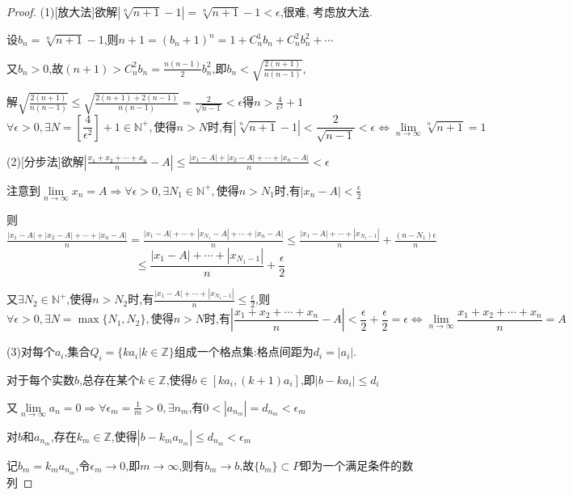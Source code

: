 \begin{proof}
    (1)[放大法]欲解$|\sqrt[n]{n+1}-1|=\sqrt[n]{n+1}-1<\epsilon$,很难, 考虑放大法.

    设$b_n=\sqrt[n]{n+1}-1$,则$n+1=(b_n+1)^n=1+C_n^1b_n+C_n^2b_n^2+\cdots $

    又$b_n>0$,故$(n+1)>C_n^2b_n=\frac{n(n-1)}{2}b_n^2$,即$b_n< \sqrt{\frac{2(n+1)}{n(n-1)}}$,

    解$\sqrt{\frac{2(n+1)}{n(n-1)}}\le\sqrt{\frac{2(n+1)+2(n-1)}{n(n-1)}}=\frac{2}{\sqrt{n-1}}<\epsilon$得$n>\frac{4}{\epsilon^2}+1$
    \begin{equation*}
        \forall \epsilon>0,\exists N=[\frac{4}{\epsilon^2}]+1 \in \mathbb{N}^+,\mbox{使得}n>N\mbox{时,有}|\sqrt[n]{n+1}-1|<\frac{2}{\sqrt{n-1}}<\epsilon\Longleftrightarrow \lim\limits_{n\to \infty}\sqrt[n]{n+1}=1
    \end{equation*}

    (2)[分步法]欲解$|\frac{x_1+x_2+\cdots+x_n}{n}-A|\le \frac{|x_1-A|+|x_2-A|+\cdots+|x_n-A|}{n}<\epsilon$

    注意到$\lim\limits_{n\to \infty} x_n=A \Longrightarrow\forall \epsilon>0,\exists N_1 \in \mathbb{N}^+,\mbox{使得}n>N_1\mbox{时,有}|x_n-A|<\frac{\epsilon}{2}$

    则$\frac{|x_1-A|+|x_2-A|+\cdots+|x_n-A|}{n}=\frac{|x_1-A|+\cdots+|x_{N_1}-A|+\cdots+|x_n-A|}{n} \le \frac{|x_1-A|+\cdots+|x_{N_1-1}|}{n}+\frac{(n-N_1)\epsilon}{n}$
    $$\le \frac{|x_1-A|+\cdots+|x_{N_1-1}|}{n}+\frac{\epsilon}{2}$$

    又$\exists N_2\in \mathbb{N}^+$,使得$n>N_2$时,有$\frac{|x_1-A|+\cdots+|x_{N_1-1}|}{n}\le \frac{\epsilon}{2}$,则
    \begin{equation*}
        \forall \epsilon>0,\exists N=\max \{N_1,N_2\},\mbox{使得}n>N\mbox{时,有}|\frac{x_1+x_2+\cdots+x_n}{n}-A|<\frac{\epsilon}{2}+\frac{\epsilon}{2}=\epsilon\Longleftrightarrow \lim\limits_{n\to \infty} \frac{x_1+x_2+\cdots+x_n}{n}=A
    \end{equation*}

    (3)对每个$a_i$,集合$Q_i=\{ka_i|k\in \mathbb{Z}\}$组成一个格点集:格点间距为$d_i=|a_i|$.

    对于每个实数$b$,总存在某个$k\in \mathbb{Z}$,使得$b\in[ka_i,(k+1)a_i]$,即$|b-ka_i|\le d_i$

    又$\lim\limits_{n\to \infty}a_n=0\Longrightarrow \forall \epsilon_m=\frac{1}{m}>0,\exists n_m$,有$0<|a_{n_m}|=d_{n_m}<\epsilon_m$

    对$b$和$a_{n_m}$,存在$k_m\in \mathbb{Z}$,使得$|b-k_ma_{n_m}|\le d_{n_m}<\epsilon_m$

    记$b_m=k_ma_{n_m}$,令$\epsilon_m\to 0$,即$m\to \infty$,则有$b_m\to b$,故$\{b_m\}\subset P$即为一个满足条件的数列
\end{proof}

